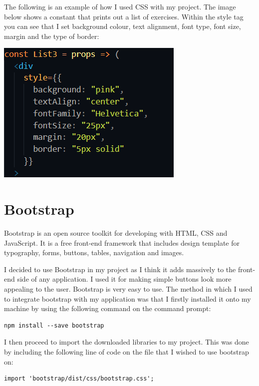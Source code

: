 The following is an example of how I used CSS with my project. The image below shows a constant that prints out a list of exercises. Within the style tag you can see that I set background colour, text alignment, font type, font size, margin and the type of border:


\begin{center}    
\includegraphics{img/css.png}
\end{center}

\section{Bootstrap}
Bootstrap is an open source toolkit for developing with HTML, CSS and JavaScript\cite{Bootstrap}. It is a free front-end framework that includes design template for typography, forms, buttons, tables, navigation and images.

I decided to use Bootstrap in my project as I think it adds massively to the front-end side of any application. I used it for making simple buttons look more appealing to the user. Bootstrap is very easy to use. The method in which I used to integrate bootstrap with my application was that I  firstly installed it onto my machine by using the following command on the command prompt: 

\begin{lstlisting}
npm install --save bootstrap
\end{lstlisting}

I then proceed to import the downloaded libraries to my project. This was done by including the following line of code on the file that I wished to use bootstrap on:

\begin{lstlisting}
import 'bootstrap/dist/css/bootstrap.css';
\end{lstlisting}

